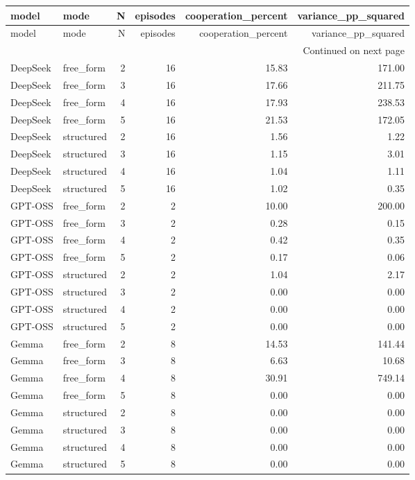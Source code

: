 \begin{longtable}{llrrrr}
\toprule
model & mode & N & episodes & cooperation\_percent & variance\_pp\_squared \\
\midrule
\endfirsthead
\toprule
model & mode & N & episodes & cooperation\_percent & variance\_pp\_squared \\
\midrule
\endhead
\midrule
\multicolumn{6}{r}{Continued on next page} \\
\midrule
\endfoot
\bottomrule
\endlastfoot
DeepSeek & free\_form & 2 & 16 & 15.83 & 171.00 \\
DeepSeek & free\_form & 3 & 16 & 17.66 & 211.75 \\
DeepSeek & free\_form & 4 & 16 & 17.93 & 238.53 \\
DeepSeek & free\_form & 5 & 16 & 21.53 & 172.05 \\
DeepSeek & structured & 2 & 16 & 1.56 & 1.22 \\
DeepSeek & structured & 3 & 16 & 1.15 & 3.01 \\
DeepSeek & structured & 4 & 16 & 1.04 & 1.11 \\
DeepSeek & structured & 5 & 16 & 1.02 & 0.35 \\
GPT-OSS & free\_form & 2 & 2 & 10.00 & 200.00 \\
GPT-OSS & free\_form & 3 & 2 & 0.28 & 0.15 \\
GPT-OSS & free\_form & 4 & 2 & 0.42 & 0.35 \\
GPT-OSS & free\_form & 5 & 2 & 0.17 & 0.06 \\
GPT-OSS & structured & 2 & 2 & 1.04 & 2.17 \\
GPT-OSS & structured & 3 & 2 & 0.00 & 0.00 \\
GPT-OSS & structured & 4 & 2 & 0.00 & 0.00 \\
GPT-OSS & structured & 5 & 2 & 0.00 & 0.00 \\
Gemma & free\_form & 2 & 8 & 14.53 & 141.44 \\
Gemma & free\_form & 3 & 8 & 6.63 & 10.68 \\
Gemma & free\_form & 4 & 8 & 30.91 & 749.14 \\
Gemma & free\_form & 5 & 8 & 0.00 & 0.00 \\
Gemma & structured & 2 & 8 & 0.00 & 0.00 \\
Gemma & structured & 3 & 8 & 0.00 & 0.00 \\
Gemma & structured & 4 & 8 & 0.00 & 0.00 \\
Gemma & structured & 5 & 8 & 0.00 & 0.00 \\

\end{longtable}
